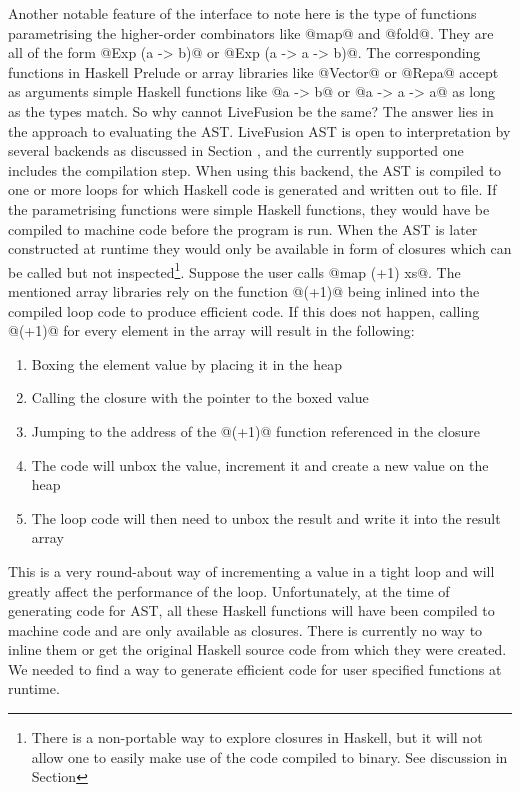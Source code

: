 \documentclass[preamble.tex]{subfiles}
\begin{document}
Another notable feature of the interface to note here is the type of functions parametrising the higher-order combinators like @map@ and @fold@. They are all of the form @Exp (a -> b)@ or @Exp (a -> a -> b)@. The corresponding functions in Haskell Prelude or array libraries like @Vector@ or @Repa@ accept as arguments simple Haskell functions like @a -> b@ or @a -> a -> a@ as long as the types match. So why cannot LiveFusion be the same? The answer lies in the approach to evaluating the AST. LiveFusion AST is open to interpretation by several backends as discussed in Section , and the currently supported one includes the compilation step. When using this backend, the AST is compiled to one or more loops for which Haskell code is generated and written out to file. If the parametrising functions were simple Haskell functions, they would have be compiled to machine code before the program is run. When the AST is later constructed at runtime they would only be available in form of closures which can be called but not inspected\footnote{There is a non-portable way to explore closures in Haskell, but it will not allow one to easily make use of the code compiled to binary. See discussion in Section }. Suppose the user calls @map (+1) xs@. The mentioned array libraries rely on the function @(+1)@ being inlined into the compiled loop code to produce efficient code. If this does not happen, calling @(+1)@ for every element in the array will result in the following:

\begin{enumerate}
\item Boxing the element value by placing it in the heap
\item Calling the closure with the pointer to the boxed value
\item Jumping to the address of the @(+1)@ function referenced in the closure
\item The code will unbox the value, increment it and create a new value on the heap
\item The loop code will then need to unbox the result and write it into the result array
\end{enumerate}

This is a very round-about way of incrementing a value in a tight loop and will greatly affect the performance of the loop. Unfortunately, at the time of generating code for AST, all these Haskell functions will have been compiled to machine code and are only available as closures. There is currently no way to inline them or get the original Haskell source code from which they were created. We needed to find a way to generate efficient code for user specified functions at runtime.
\end{document}

